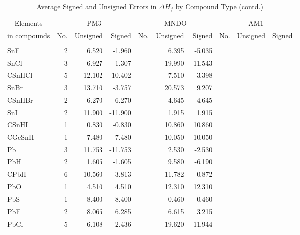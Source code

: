 \begin{table}
\caption{\label{avehofe}Average Signed and Unsigned Errors in $\Delta H_f$ by
 Compound Type (contd.)}
\compresstable
\begin{center}
\begin{tabular}{lrrrrrrrrr}
\multicolumn{1}{c}{Elements} & \multicolumn{3}{c}{PM3} & \multicolumn{3}{c}{MNDO} &
\multicolumn{3}{c}{AM1} \\
\multicolumn{1}{c}{in compounds} &  No. & Unsigned & Signed & No. & Unsigned & Signed & No. & Unsigned & Signed \\
\hline\\
  SnF       &   2 &    6.520 &   -1.960 &     &    6.395 &   -5.035 &     &          &          \\
  SnCl      &   3 &    6.927 &    1.307 &     &   19.990 &  -11.543 &     &          &          \\
  CSnHCl    &   5 &   12.102 &   10.402 &     &    7.510 &    3.398 &     &          &          \\
  SnBr      &   3 &   13.710 &   -3.757 &     &   20.573 &    9.207 &     &          &          \\
  CSnHBr    &   2 &    6.270 &   -6.270 &     &    4.645 &    4.645 &     &          &          \\
  SnI       &   2 &   11.900 &  -11.900 &     &    1.915 &    1.915 &     &          &          \\
  CSnHI     &   1 &    0.830 &   -0.830 &     &   10.860 &   10.860 &     &          &          \\
  CGeSnH    &   1 &    7.480 &    7.480 &     &   10.050 &   10.050 &     &          &          \\
  Pb        &   3 &   11.753 &  -11.753 &     &    2.530 &   -2.530 &     &          &          \\
  PbH       &   2 &    1.605 &   -1.605 &     &    9.580 &   -6.190 &     &          &          \\
  CPbH      &   6 &   10.560 &    3.813 &     &   11.782 &    0.872 &     &          &          \\
  PbO       &   1 &    4.510 &    4.510 &     &   12.310 &   12.310 &     &          &          \\
  PbS       &   1 &    8.400 &    8.400 &     &    0.460 &    0.460 &     &          &          \\
  PbF       &   2 &    8.065 &    6.285 &     &    6.615 &    3.215 &     &          &          \\
  PbCl      &   5 &    6.108 &   -2.436 &     &   19.620 &  -11.944 &     &          &          \\

\end{tabular}
\end{center}
\end{table}
